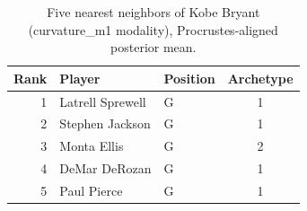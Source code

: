\begin{table}[htbp]
  \centering\small
  \begin{tabular}{rllc}
    \toprule
    Rank & Player & Position & Archetype \\
    \midrule
    1 & Latrell Sprewell & G & 1 \\
    2 & Stephen Jackson & G & 1 \\
    3 & Monta Ellis & G & 2 \\
    4 & DeMar DeRozan & G & 1 \\
    5 & Paul Pierce & G & 1 \\
    \bottomrule
  \end{tabular}
  \caption{Five nearest neighbors of Kobe Bryant (curvature_m1 modality), Procrustes-aligned posterior mean.}
  \label{tab:Kobe_Bryant_neighbors_curvature_m1}
\end{table}

